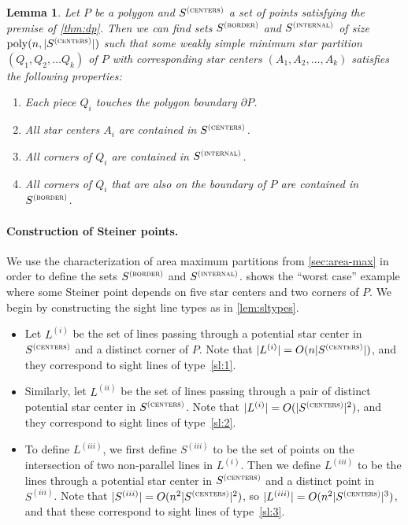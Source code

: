\documentclass[10pt,a4paper]{article}
\newtheorem{lemma}{Lemma}[section]
\newcommand\Scen{S^{\textsc{(centers)}}}
\newcommand\Sint{S^{\textsc{(internal)}}}
\newcommand\Sbor{S^{\textsc{(border)}}}
\newcommand\poly{\mathrm{poly}}
\begin{document}
\begin{lemma}
\label{lem:dp-points}
Let $P$ be a polygon and $\Scen$ a set of points satisfying the premise of \cref{thm:dp}.
Then we can find sets $\Sbor$ and $\Sint$ of size $\poly(n, |\Scen|)$ such that some weakly simple
minimum star partition $(Q_1, Q_2, \ldots Q_k)$ of $P$ with corresponding star centers $(A_1, A_2, \ldots, A_k)$ satisfies the following properties:
\begin{enumerate}
    \item Each piece $Q_i$ touches the polygon boundary $\partial P$.
    \item All star centers $A_i$ are contained in $\Scen$.
    \item All corners of $Q_i$ are contained in $\Sint$. 
    \item All corners of $Q_i$ that are also on the boundary of $P$ are contained in $\Sbor$. 
\end{enumerate}
\end{lemma}

\paragraph{Construction of Steiner points.}
We use the characterization of area maximum partitions from \cref{sec:area-max} in order to define the sets $\Sbor$ and $\Sint$.  shows the ``worst case'' example where some Steiner point depends on five star centers and two corners of $P$.
We begin by constructing the sight line types as in \cref{lem:sltypes}.

\begin{itemize}
\item Let $L^{(i)}$ be the set of lines passing through a potential star center in $\Scen$ and a distinct corner of $P$. Note that $|L^{(i)}| = O(n|\Scen|)$, and they correspond to sight lines of type~\ref{sl:1}.
\item Similarly, let $L^{(ii)}$ be the set of lines passing through a pair of distinct potential star center in $\Scen$. Note that $|L^{(i)}| = O(|\Scen|^2)$, and they correspond to sight lines of type~\ref{sl:2}.
\item To define $L^{(iii)}$, we first define $S^{(iii)}$ to be the set of points on the intersection of two non-parallel lines in $L^{(i)}$.  Then we define $L^{(iii)}$ to be the lines through a potential star center in $\Scen$ and a distinct point in $S^{(iii)}$.
Note that $|S^{(iii)}| = O(n^2|\Scen|^2)$, so $|L^{(iii)}| = O(n^2|\Scen|^3)$, and that these correspond to sight lines of type~\ref{sl:3}.
\end{itemize}
\end{document}
